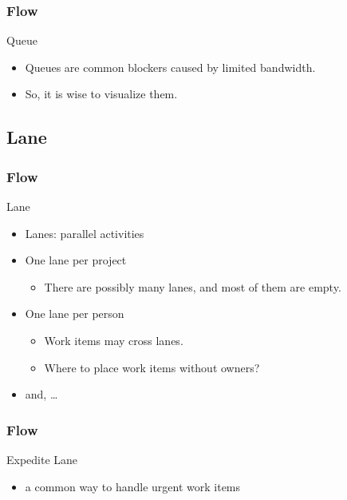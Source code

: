 \documentclass[lualatex]{beamer}
\begin{document}
\begin{frame}
  \frametitle{Flow}

  \begin{block}{Queue}
    \begin{itemize}
    \item Queues are common blockers caused by limited bandwidth.
    \item So, it is wise to visualize them.
    \end{itemize}
  \end{block}
\end{frame}

\subsection{Lane}

\begin{frame}
  \frametitle{Flow}

  \begin{block}{Lane}
    \begin{itemize}
    \item Lanes: parallel activities
    \item One lane per project
      \begin{itemize}
      \item There are possibly many lanes, and most of them are empty.
      \end{itemize}
    \item One lane per person
      \begin{itemize}
      \item Work items may cross lanes.
      \item Where to place work items without owners? 
      \end{itemize}
    \item and, \dots
    \end{itemize}
  \end{block}
\end{frame}

\begin{frame}
  \frametitle{Flow}

  \begin{block}{Expedite Lane}
    \begin{itemize}
    \item a common way to handle urgent work items
    \end{itemize}
  \end{block}
\end{frame}
\end{document}
